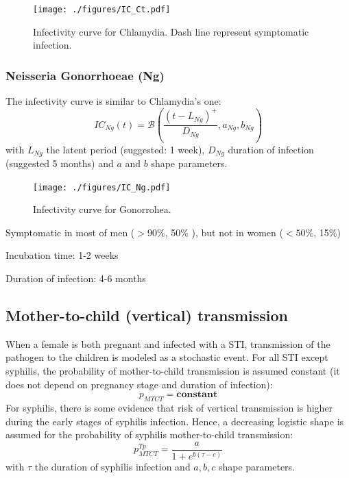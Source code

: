\documentclass[11pt, onecolumn]{article}
\begin{document}
\begin{figure}[!ht]
\centering
    \texttt{[image: ./figures/IC\_Ct.pdf]}
\caption{Infectivity curve for Chlamydia. Dash line represent symptomatic infection.}
\label{fig:ICCt}
\end{figure}



\subsubsection{Neisseria Gonorrhoeae (Ng)}

 The infectivity curve is similar to Chlamydia's one:
$$IC_{Ng}(t) = \mathcal{B}\left(\frac{(t-L_{Ng})^+}{D_{Ng}},a_{Ng},b_{Ng}\right)$$
with $L_{Ng}$ the latent period (suggested: 1 week), $D_{Ng}$ duration of infection (suggested 5 months) and $a$ and $b$ shape parameters.
\begin{figure}[!ht]
\centering
    \texttt{[image: ./figures/IC\_Ng.pdf]}
\caption{Infectivity curve for Gonorrohea.}
\label{fig:ICNg}
\end{figure} 

 Symptomatic in most of men ($> 90\%$\cite{Ison:2011eg,Kretzschmar:1996ur}, 50\%\cite{Korenromp:2002gt} ), but not in women ($< 50\%$\cite{Ison:2011eg,Kretzschmar:1996ur}, 15\%\cite{Korenromp:2002gt}) 
 
 Incubation time: 1-2 weeks\cite{Kretzschmar:1996ur}
 
 Duration of infection: 4-6 months \cite{Chen:2010hx,Korenromp:2002gt}

 
 \subsection{Mother-to-child (vertical) transmission}
 
 When a female is both pregnant and infected with a STI, transmission of the pathogen to the children is modeled as a stochastic event. For all STI except syphilis, the probability of mother-to-child transmission is assumed constant (it does not depend on pregnancy stage and duration of infection):
 $$ p_{MTCT} = \mathbf{constant}$$
 For syphilis, there is some evidence \cite{Karumudi:2005jb,Karp:2009hy} that risk of vertical transmission is higher during the early stages of syphilis infection. Hence, a decreasing logistic shape is assumed for the probability of syphilis mother-to-child transmission:
 $$p_{MTCT}^{Tp} = \frac{a}{1+e^{b(\tau-c)}}$$
 with $\tau$ the duration of syphilis infection and $a,b,c$ shape parameters.
 
\end{document}
